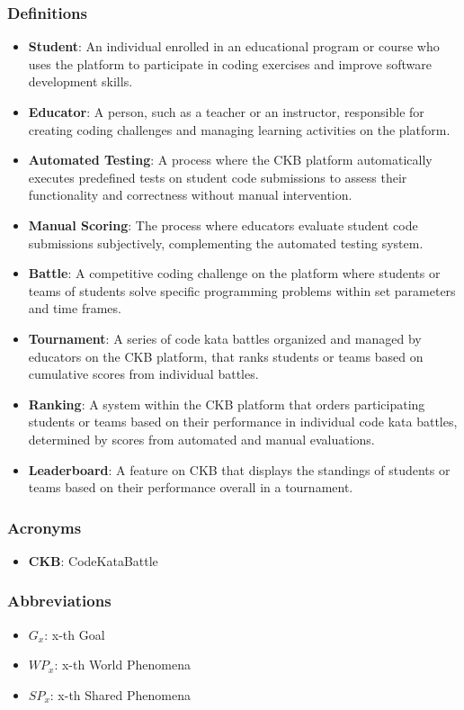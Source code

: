 \subsubsection{Definitions}
\begin{itemize}
    \item \textbf{Student}: An individual enrolled in an educational program or course who uses the platform to participate in coding exercises and improve software development skills.
    \item \textbf{Educator}: A person, such as a teacher or an instructor, responsible for creating coding challenges and managing learning activities on the platform.
    \item \textbf{Automated Testing}: A process where the CKB platform automatically executes predefined tests on student code submissions to assess their functionality and correctness without manual intervention.
    \item \textbf{Manual Scoring}: The process where educators evaluate student code submissions subjectively, complementing the automated testing system.
    \item \textbf{Battle}: A competitive coding challenge on the platform where students or teams of students solve specific programming problems within set parameters and time frames.
    \item \textbf{Tournament}: A series of code kata battles organized and managed by educators on the CKB platform, that ranks students or teams based on cumulative scores from individual battles.
    \item \textbf{Ranking}: A system within the CKB platform that orders participating students or teams based on their performance in individual code kata battles, determined by scores from automated and manual evaluations.
    \item \textbf{Leaderboard}: A feature on CKB that displays the standings of students or teams based on their performance overall in a tournament.
\end{itemize}

\subsubsection{Acronyms}
\begin{itemize}
    \item \textbf{CKB}: CodeKataBattle
\end{itemize}

\subsubsection{Abbreviations}
\begin{itemize}
    \item $G_{x}$: x-th Goal
    \item $WP_{x}$: x-th World Phenomena
    \item $SP_{x}$: x-th Shared Phenomena
\end{itemize}